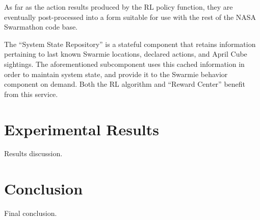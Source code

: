 \documentclass[sigconf,authordraft]{acmart}
\begin{document}
As far as the action results produced by the RL policy function, they are eventually post-processed into a form suitable for use with the rest of the NASA Swarmathon code base.

The ``System State Repository'' is a stateful component that retains information pertaining to last known Swarmie locations, declared actions, and April Cube sightings. The aforementioned subcomponent uses this cached information in order to maintain system state, and provide it to the Swarmie behavior component on demand. Both the RL algorithm and ``Reward Center'' benefit from this service.

\section{Experimental Results}\label{sec:results}
Results discussion.

\section{Conclusion}\label{sec:conclusion}
Final conclusion.



\end{document}

